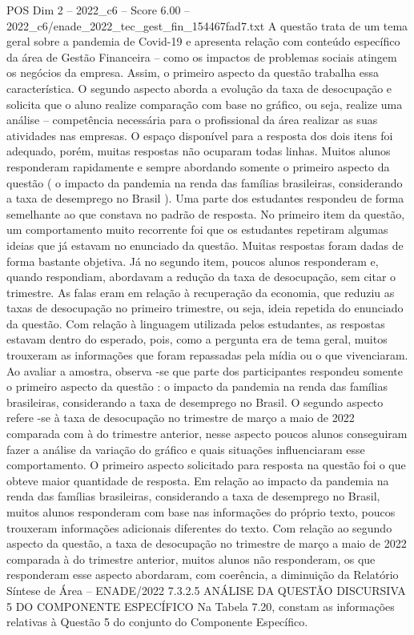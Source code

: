\begin{textsample}{POS Dim 2 – 2022\_c6 – Score 6.00 – 2022\_c6/enade\_2022\_tec\_gest\_fin\_154467fad7.txt}
A questão trata de um tema geral sobre a pandemia de Covid-19 e apresenta relação com conteúdo específico da área de Gestão Financeira – como os impactos de problemas sociais atingem os negócios da empresa.
Assim, o primeiro aspecto da questão trabalha essa característica.
O segundo aspecto aborda a evolução da taxa de desocupação e solicita que o aluno realize comparação com base no gráfico, ou seja, realize uma análise – competência necessária para o profissional da área realizar as suas atividades nas empresas.
O espaço disponível para a resposta dos dois itens foi adequado, porém, muitas respostas não ocuparam todas linhas.
Muitos alunos responderam rapidamente e sempre abordando somente o primeiro aspecto da questão ( o impacto da pandemia na renda das famílias brasileiras, considerando a taxa de desemprego no Brasil ).
Uma parte dos estudantes respondeu de forma semelhante ao que constava no padrão de resposta.
No primeiro item da questão, um comportamento muito recorrente foi que os estudantes repetiram algumas ideias que já estavam no enunciado da questão.
Muitas respostas foram dadas de forma bastante objetiva.
Já no segundo item, poucos alunos responderam e, quando respondiam, abordavam a redução da taxa de desocupação, sem citar o trimestre.
As falas eram em relação à recuperação da economia, que reduziu as taxas de desocupação no primeiro trimestre, ou seja, ideia repetida do enunciado da questão.
Com relação à linguagem utilizada pelos estudantes, as respostas estavam dentro do esperado, pois, como a pergunta era de tema geral, muitos trouxeram as informações que foram repassadas pela mídia ou o que vivenciaram.
Ao avaliar a amostra, observa -se que parte dos participantes respondeu somente o primeiro aspecto da questão : o impacto da pandemia na renda das famílias brasileiras, considerando a taxa de desemprego no Brasil.
O segundo aspecto refere -se à taxa de desocupação no trimestre de março a maio de 2022 comparada com à do trimestre anterior, nesse aspecto poucos alunos conseguiram fazer a análise da variação do gráfico e quais situações influenciaram esse comportamento.
O primeiro aspecto solicitado para resposta na questão foi o que obteve maior quantidade de resposta.
Em relação ao impacto da pandemia na renda das famílias brasileiras, considerando a taxa de desemprego no Brasil, muitos alunos responderam com base nas informações do próprio texto, poucos trouxeram informações adicionais diferentes do texto.
Com relação ao segundo aspecto da questão, a taxa de desocupação no trimestre de março a maio de 2022 comparada à do trimestre anterior, muitos alunos não responderam, os que responderam esse aspecto abordaram, com coerência, a diminuição da Relatório Síntese de Área – ENADE/2022 7.3.2.5 ANÁLISE DA QUESTÃO DISCURSIVA 5 DO COMPONENTE ESPECÍFICO Na Tabela 7.20, constam as informações relativas à Questão 5 do conjunto do Componente Específico.

\end{textsample}
